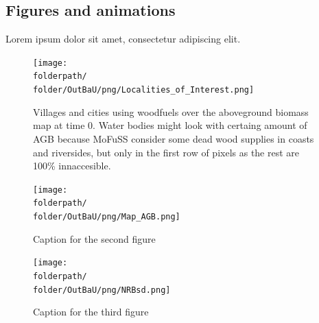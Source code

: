 \documentclass{article}
\def\folderpath{D:/}
\begin{document}
{	\subsection{Figures and animations}
	Lorem ipsum dolor sit amet, consectetur adipiscing elit.\\
	
	\begin{figure}[H]
		 \centering
		 \texttt{[image: \\folderpath/\\folder/OutBaU/png/Localities\_of\_Interest.png]}
		 \caption{Villages and cities using woodfuels over the aboveground biomass map at time 0. Water bodies might look with certaing amount of AGB because MoFuSS consider some dead wood supplies in coasts and riversides, but only in the first row of pixels as the rest are 100\% innaccesible.}
	\end{figure}
	    
	\begin{figure}[H]
		\centering
		\texttt{[image: \\folderpath/\\folder/OutBaU/png/Map\_AGB.png]}
		\caption{Caption for the second figure}
	\end{figure}

	\begin{figure}[H]
		\centering
		\texttt{[image: \\folderpath/\\folder/OutBaU/png/NRBsd.png]}
		\caption{Caption for the third figure}
	\end{figure}


}

\clearpage
\end{document}
